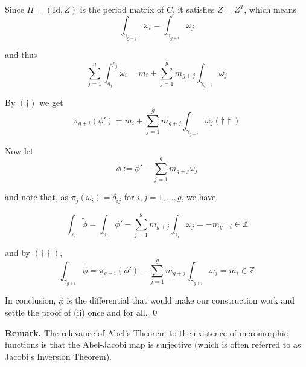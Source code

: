 \documentclass[11pt,a4paper]{article}
\begin{document}
Since $\Pi=(\text{Id},Z)$ is the period matrix of $C$, it satisfies $Z = Z^T$, which means
$$\int_{\gamma_{g+j}}\omega_i = \int_{\gamma_{g+i}}\omega_j$$

and thus
$$\sum_{j=1}^{n}\int_{q_j}^{p_j}\omega_i = m_i + \sum_{j=1}^{g} m_{g+j}\int_{\gamma_{g+i}}\omega_j$$

By $(\dagger)$ we get
$$\pi_{g+i}(\phi') = m_i + \sum_{j=1}^{g} m_{g+j}\int_{\gamma_{g+i}}\omega_j   (\dagger\dagger)$$

Now let
$$\widetilde{\phi}:= \phi' - \sum_{j=1}^{g} m_{g+j}\omega_j$$

and note that, as $\pi_j(\omega_i) = \delta_{ij}$ for $i,j = 1, \ldots, g$, we have

$$\int_{\gamma_i}\widetilde{\phi} = \int_{\gamma_i}\phi' - \sum_{j=1}^{g} m_{g+j}\int_{\gamma_i}\omega_j = -m_{g+i} \in \mathbb{Z}$$

and by $(\dagger\dagger)$,
$$\int_{\gamma_{g+i}}\widetilde{\phi} = \pi_{g+i}(\phi') - \sum_{j=1}^{g} m_{g+j}\int_{\gamma_{g+i}}\omega_j = m_i \in \mathbb{Z}$$

In conclusion, $\widetilde{\phi}$ is the differential that would make our construction work and settle the proof of (ii) once and for all.
\qed

\textbf{Remark.} The relevance of Abel's Theorem to the existence of meromorphic functions is that the Abel-Jacobi map is surjective (which is often referred to as Jacobi's Inversion Theorem).
\end{document}
